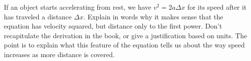  If an object starts accelerating from rest, we have
$v^2=2a\Delta x$ for its speed after it has traveled a
distance $\Delta x$. Explain in words why it makes sense
that the equation has velocity squared, but distance only to
the first power. Don't recapitulate the derivation in the
book, or give a justification based on units. The point is
to explain what this feature of the equation tells us about
the way speed increases as more distance is covered.
